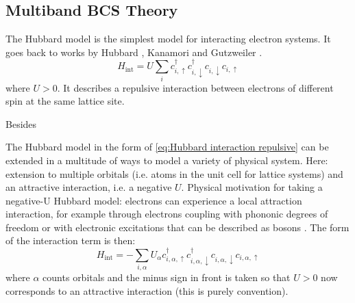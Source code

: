 \documentclass[../notes.tex]{subfiles}
\begin{document}

\subsection*{Multiband BCS Theory}

The Hubbard model is the simplest model for interacting electron systems.
It goes back to works by Hubbard \cite{hubbardElectronCorrelationsNarrow1963}, Kanamori \cite{kanamoriElectronCorrelationFerromagnetism1963} and Gutzweiler \cite{gutzwillerEffectCorrelationFerromagnetism1963}.
\begin{equation}
	H_{\mathrm{int}} = U \sum_{i} c_{i, \uparrow}^{\dagger} c_{i, \downarrow}^{\dagger} c_{i, \downarrow} c_{i, \uparrow}
	\label{eq:Hubbard interaction repulsive}
\end{equation}
where \(U > 0\).
It describes a repulsive interaction between electrons of different spin at the same lattice site.


Besides 

\cite{qinHubbardModelComputational2022}


The Hubbard model  in the form of \cref{eq:Hubbard interaction repulsive} can be extended in a multitude of ways to model a variety of physical system.
Here: extension to multiple orbitals (i.e. atoms in the unit cell for lattice systems) and an attractive interaction, i.e. a negative \(U\).
Physical motivation for taking a negative-U Hubbard model: electrons can experience a local attraction interaction, for example through electrons coupling with phononic degrees of freedom or with electronic excitations that can be described as bosons \cite{micnasSuperconductivityNarrowbandSystems1990}.
The form of the interaction term is then: 
\begin{equation}
	H_{\mathrm{int}} = -\sum_{i, \alpha} U_{\alpha} c_{i, \alpha, \uparrow}^{\dagger} c_{i, \alpha, \downarrow}^{\dagger} c_{i, \alpha, \downarrow} c_{i, \alpha, \uparrow}
	\label{eq:Hubbard interaction multiband}
\end{equation}
where \(\alpha\) counts orbitals and the minus sign in front is taken so that \(U > 0\) now corresponds to an attractive interaction (this is purely convention).
\end{document}
